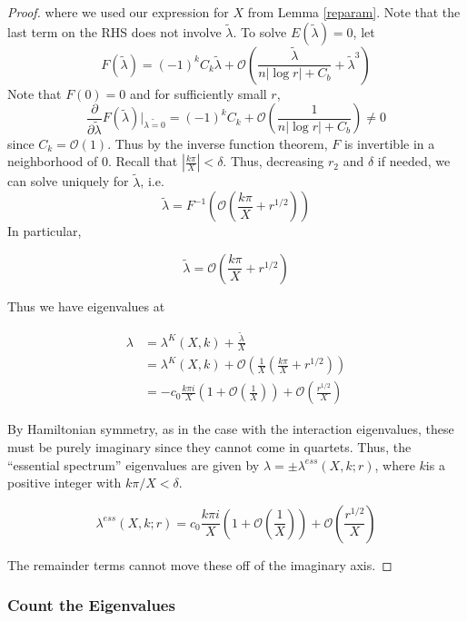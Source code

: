 \documentclass[thesis.tex]{subfiles}
\begin{document}
\begin{lemma}
\begin{proof}
where we used our expression for $X$ from Lemma \ref{reparam}. Note that the last term on the RHS does not involve $\tilde{\lambda}$. To solve $E(\tilde{\lambda}) = 0$, let
\[
F(\tilde{\lambda}) = (-1)^k C_k \tilde{\lambda} + \mathcal{O}\left( \frac{\tilde{\lambda}}{n|\log r| + C_b} + \tilde{\lambda}^3 \right)
\]
Note that $F(0) = 0$ and for sufficiently small $r$, 
\[
\frac{\partial}{\partial\tilde{\lambda}}F(\tilde{\lambda})\big|_{\tilde{\lambda = 0}}
= (-1)^k C_k + \mathcal{O}\left( \frac{1}{n|\log r| + C_b} \right) \neq 0
\]
since $C_k = \mathcal{O}(1)$. Thus by the inverse function theorem, $F$ is invertible in a neighborhood of 0. Recall that  $|\frac{k \pi}{X}| < \delta$. Thus, decreasing $r_2$ and $\delta$ if needed, we can solve uniquely for $\tilde{\lambda}$, i.e. 
\[
\tilde{\lambda} = F^{-1}\left( \mathcal{O} \left( \frac{k \pi}{X} + r^{1/2} \right)\right)
\]
In particular,

\[
\tilde{\lambda} = \mathcal{O}\left( \frac{k \pi}{X} + r^{1/2} \right)
\]

Thus we have eigenvalues at

\begin{align*}
\lambda &= \lambda^K(X,k) + \frac{\tilde{\lambda}}{X} \\
&= \lambda^K(X,k) + \mathcal{O}\left( \frac{1}{X} \left( \frac{k \pi}{X} + r^{1/2} \right) \right)\\
&= -c_0 \frac{k \pi i }{X} \left( 1 + \mathcal{O}\left( \frac{1}{X} \right)\right) + \mathcal{O}\left( \frac{r^{1/2}}{X} \right)
\end{align*}

By Hamiltonian symmetry, as in the case with the interaction eigenvalues, these must be purely imaginary since they cannot come in quartets. Thus, the ``essential spectrum'' eigenvalues are given by $\lambda = \pm \lambda^{ess}(X, k; r)$, where $k$is a positive integer with $k \pi/X < \delta$.

\[
\lambda^{ess}(X, k; r) = c_0 \frac{k \pi i }{X} \left( 1 + \mathcal{O}\left( \frac{1}{X} \right)\right) + \mathcal{O}\left( \frac{r^{1/2}}{X} \right)
\]

The remainder terms cannot move these off of the imaginary axis.

\end{proof}
\end{lemma}

\subsubsection{Count the Eigenvalues}
\end{document}
